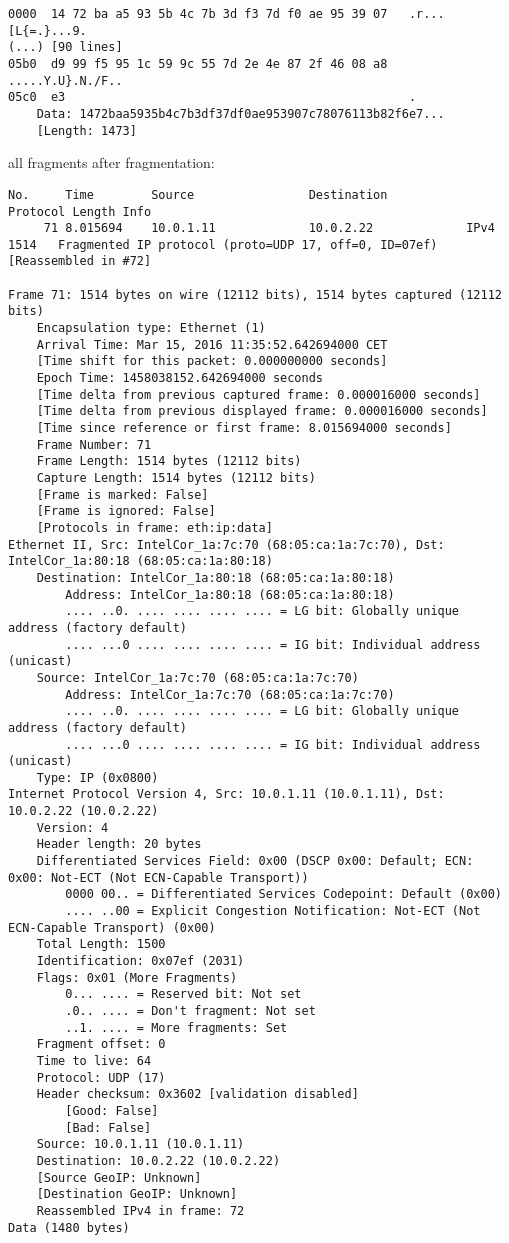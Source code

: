 \begin{lstlisting}
0000  14 72 ba a5 93 5b 4c 7b 3d f3 7d f0 ae 95 39 07   .r...[L{=.}...9.
(...) [90 lines]
05b0  d9 99 f5 95 1c 59 9c 55 7d 2e 4e 87 2f 46 08 a8   .....Y.U}.N./F..
05c0  e3                                                .
    Data: 1472baa5935b4c7b3df37df0ae953907c78076113b82f6e7...
    [Length: 1473]
\end{lstlisting}

all fragments after fragmentation:
\begin{lstlisting}
No.     Time        Source                Destination           Protocol Length Info
     71 8.015694    10.0.1.11             10.0.2.22             IPv4     1514   Fragmented IP protocol (proto=UDP 17, off=0, ID=07ef) [Reassembled in #72]

Frame 71: 1514 bytes on wire (12112 bits), 1514 bytes captured (12112 bits)
    Encapsulation type: Ethernet (1)
    Arrival Time: Mar 15, 2016 11:35:52.642694000 CET
    [Time shift for this packet: 0.000000000 seconds]
    Epoch Time: 1458038152.642694000 seconds
    [Time delta from previous captured frame: 0.000016000 seconds]
    [Time delta from previous displayed frame: 0.000016000 seconds]
    [Time since reference or first frame: 8.015694000 seconds]
    Frame Number: 71
    Frame Length: 1514 bytes (12112 bits)
    Capture Length: 1514 bytes (12112 bits)
    [Frame is marked: False]
    [Frame is ignored: False]
    [Protocols in frame: eth:ip:data]
Ethernet II, Src: IntelCor_1a:7c:70 (68:05:ca:1a:7c:70), Dst: IntelCor_1a:80:18 (68:05:ca:1a:80:18)
    Destination: IntelCor_1a:80:18 (68:05:ca:1a:80:18)
        Address: IntelCor_1a:80:18 (68:05:ca:1a:80:18)
        .... ..0. .... .... .... .... = LG bit: Globally unique address (factory default)
        .... ...0 .... .... .... .... = IG bit: Individual address (unicast)
    Source: IntelCor_1a:7c:70 (68:05:ca:1a:7c:70)
        Address: IntelCor_1a:7c:70 (68:05:ca:1a:7c:70)
        .... ..0. .... .... .... .... = LG bit: Globally unique address (factory default)
        .... ...0 .... .... .... .... = IG bit: Individual address (unicast)
    Type: IP (0x0800)
Internet Protocol Version 4, Src: 10.0.1.11 (10.0.1.11), Dst: 10.0.2.22 (10.0.2.22)
    Version: 4
    Header length: 20 bytes
    Differentiated Services Field: 0x00 (DSCP 0x00: Default; ECN: 0x00: Not-ECT (Not ECN-Capable Transport))
        0000 00.. = Differentiated Services Codepoint: Default (0x00)
        .... ..00 = Explicit Congestion Notification: Not-ECT (Not ECN-Capable Transport) (0x00)
    Total Length: 1500
    Identification: 0x07ef (2031)
    Flags: 0x01 (More Fragments)
        0... .... = Reserved bit: Not set
        .0.. .... = Don't fragment: Not set
        ..1. .... = More fragments: Set
    Fragment offset: 0
    Time to live: 64
    Protocol: UDP (17)
    Header checksum: 0x3602 [validation disabled]
        [Good: False]
        [Bad: False]
    Source: 10.0.1.11 (10.0.1.11)
    Destination: 10.0.2.22 (10.0.2.22)
    [Source GeoIP: Unknown]
    [Destination GeoIP: Unknown]
    Reassembled IPv4 in frame: 72
Data (1480 bytes)


\end{lstlisting}
